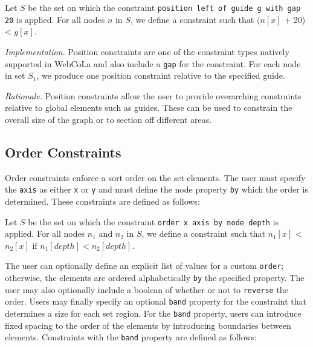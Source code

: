 \begin{definition}
Let $S$ be the set on which the constraint \texttt{position left of guide g with gap 20} is applied.
For all nodes $n$ in $S$, we define a constraint such that $(n[x]$ + 20) < $g[x]$.
\end{definition}

\emph{Implementation.}
Position constraints are one of the constraint types natively supported in
WebCoLa and also include a \texttt{gap} for the constraint. For each node
in set $S_1$, we produce one position constraint relative to the specified guide.

\emph{Rationale.} Position constraints allow the user to provide
overarching constraints relative to global elements such as guides. These
can be used to constrain the overall size of the graph or to section off
different areas.



\subsection{Order Constraints}
Order constraints enforce a sort order on the set elements. The user must 
specify the \texttt{axis} as either \texttt{x} or \texttt{y} and must define
the node property \texttt{by} which the order is determined. These 
constraints are defined as follows:

\begin{definition}
Let $S$ be the set on which the constraint \texttt{order x axis by node depth} is applied.
For all nodes $n_1$ and $n_2$ in $S$, we define a constraint such that $n_1[x]$ < $n_2[x]$
if $n_1[depth] < n_2[depth]$.
\end{definition}

The user can optionally define an explicit list of values for a custom
\texttt{order}; otherwise, the elements are ordered alphabetically \texttt{by}
the specified property. The user may also optionally include a boolean of whether
or not to \texttt{reverse} the order. Users may finally specify an optional
\texttt{band} property for the constraint that determines a size for each
set region. For the \texttt{band} property, users can introduce fixed spacing
to the order of the elements by introducing boundaries between elements.
Constraints with the \texttt{band} property are defined as follows:

